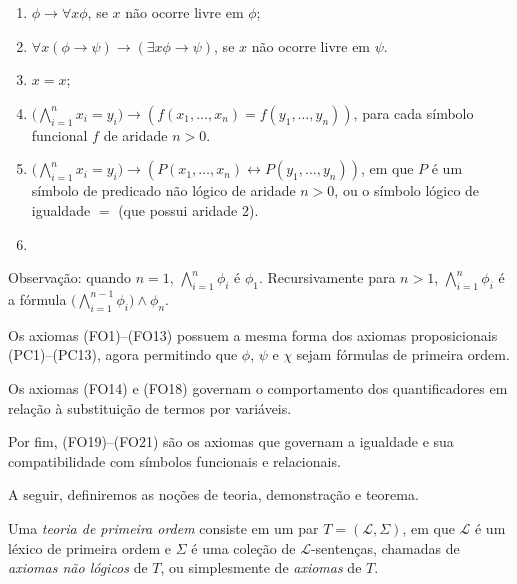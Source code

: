 \begin{metadefinition}
\begin{enumerate}[label=(FO\arabic*), leftmargin=3.2em]
        \item $\phi\rightarrow\forall x\phi$, se $x$ não ocorre livre em $\phi$;
        \item $\forall x(\phi\rightarrow\psi)\rightarrow(\exists x\phi\rightarrow\psi)$, se $x$ não ocorre livre em $\psi$.
        \item $x=x$;
        \item $\bigl(\bigwedge_{i=1}^n x_i=y_i\bigr) \rightarrow (f(x_1, \dots, x_n)=f(y_1, \dots, y_n))$, para cada símbolo funcional $f$ de aridade $n>0$.
        \item $\bigl(\bigwedge_{i=1}^n x_i=y_i\bigr) \rightarrow (P(x_1, \dots, x_n) \leftrightarrow P(y_1, \dots, y_n))$, em que $P$ é um símbolo de predicado não lógico de aridade $n>0$, ou o símbolo lógico de igualdade $=$ (que possui aridade 2).
        \item 
        \end{enumerate}

        Observação: quando $n=1$, $\bigwedge_{i=1}^n\phi_i$ é $\phi_1$.
        Recursivamente para $n>1$, $\bigwedge_{i=1}^n\phi_i$ é a fórmula $\Big(\bigwedge_{i=1}^{n-1}\phi_i\Big)\land\phi_n$.
\end{metadefinition}

Os axiomas (FO1)--(FO13) possuem a mesma forma dos axiomas proposicionais (PC1)--(PC13), agora permitindo que $\phi$, $\psi$ e $\chi$ sejam fórmulas de primeira ordem.

Os axiomas (FO14) e (FO18) governam o comportamento dos quantificadores em relação à substituição de termos por variáveis.

Por fim, (FO19)--(FO21) são os axiomas que governam a igualdade e sua compatibilidade com símbolos funcionais e relacionais.

A seguir, definiremos as noções de teoria, demonstração e teorema.

\begin{metadefinition}[Teoria]\label{mdef:teoriaPrimeiraOrdem}
    Uma \emph{teoria de primeira ordem} consiste em um par $T = (\mathcal L, \Sigma)$, em que $\mathcal L$ é um léxico de primeira ordem e $\Sigma$ é uma coleção de $\mathcal L$-sentenças, chamadas de \emph{axiomas não lógicos} de $T$, ou simplesmente de \emph{axiomas} de $T$.
\end{metadefinition}

